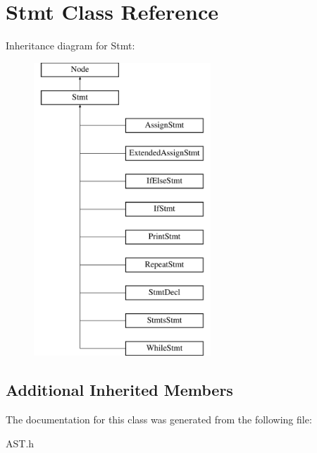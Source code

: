 \hypertarget{classStmt}{\section{Stmt Class Reference}
\label{classStmt}
}
Inheritance diagram for Stmt\-:\begin{figure}[H]
\begin{center}
\leavevmode
\includegraphics[height=11.000000cm]{classStmt}
\end{center}
\end{figure}
\subsection*{Additional Inherited Members}


The documentation for this class was generated from the following file\-:\begin{DoxyCompactItemize}
\item 
A\-S\-T.\-h\end{DoxyCompactItemize}
